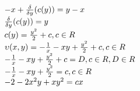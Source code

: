\documentclass{article}
\begin{document}
\begin{center}
    {
    $
    -x + \frac{\delta}{\delta y} (c(y)) = y - x\\
    $
    }\\
    {
    $
    \frac{\delta}{\delta y} (c(y)) = y\\
    $
    }\\
    {
    $
    c(y) = \frac{y^2}{2} + c, c \in R\\
    $
    }\\
    {
    $
    \upsilon(x, y) = -\frac{1}{x} - xy + \frac{y^2}{2} + c, c \in R\\
    $
    }\\
    {
    $
    -\frac{1}{x} - xy + \frac{y^2}{2} + c = D, c \in R, D \in R\\
    $
    }\\
    {
    $
    -\frac{1}{x} - xy + \frac{y^2}{2} = c, c \in R\\
    $
    }\\
    {
    $
    -2 - 2x^2y + xy^2 = cx\\
    $
    }\\\\
\end{center}\\

\begin{center}
    {
    \\
    }
\end{center}
\end{document}
